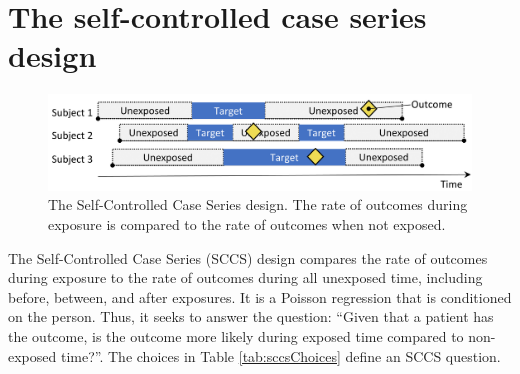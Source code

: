 \documentclass[11pt]{book}
\theoremstyle{definition}
\theoremstyle{definition}
\theoremstyle{definition}
\theoremstyle{remark}
\begin{document}
\hypertarget{the-self-controlled-case-series-design}{%
\section{The self-controlled case series design}\label{the-self-controlled-case-series-design}}


\begin{figure}

{\centering \includegraphics[width=0.9\linewidth]{images/PopulationLevelEstimation/selfControlledCaseSeries} 

}

\caption{The Self-Controlled Case Series design. The rate of outcomes during exposure is compared to the rate of outcomes when not exposed.}\label{fig:selfControlledCaseSeries}
\end{figure}

The Self-Controlled Case Series (SCCS) design \citep{farrington_1995, whitaker_2006} compares the rate of outcomes during exposure to the rate of outcomes during all unexposed time, including before, between, and after exposures. It is a Poisson regression that is conditioned on the person. Thus, it seeks to answer the question: ``Given that a patient has the outcome, is the outcome more likely during exposed time compared to non-exposed time?''. The choices in Table \ref{tab:sccsChoices} define an SCCS question.  
\end{document}
